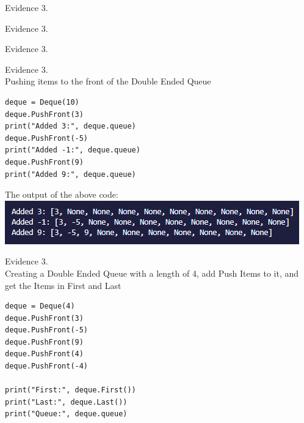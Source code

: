 \begin{flushleft}
\begin{center}
        {\large Evidence 3.\rn } \\ 
        \vspace{0.3cm}
        \vspace{1cm}

        {\large Evidence 3.\rn } \\ 
        \vspace{0.3cm}
        \vspace{1cm}

        {\large Evidence 3.\rn } \\ 
        \vspace{0.3cm}
        \vspace{1cm}

        {\large Evidence 3.\rn } \\ 
        \vspace{0.3cm}
        Pushing items to the front of the Double Ended Queue \\

        \begin{verbatim}
deque = Deque(10)
deque.PushFront(3)
print("Added 3:", deque.queue)
deque.PushFront(-5)
print("Added -1:", deque.queue)
deque.PushFront(9)
print("Added 9:", deque.queue)
        \end{verbatim}
        
        The output of the above code: \\
        \includegraphics{Images/Testing/T3.8.1.PNG}
        \vspace{1cm}

        {\large Evidence 3.\rn } \\ 
        \vspace{0.3cm}
        Creating a Double Ended Queue with a length of 4, add Push Items to it, and get the 
        Items in First and Last \\

        \begin{verbatim}
deque = Deque(4)
deque.PushFront(3)
deque.PushFront(-5)
deque.PushFront(9)
deque.PushFront(4)
deque.PushFront(-4)

print("First:", deque.First())
print("Last:", deque.Last())
print("Queue:", deque.queue)
        \end{verbatim}


\end{center}
\end{flushleft}
